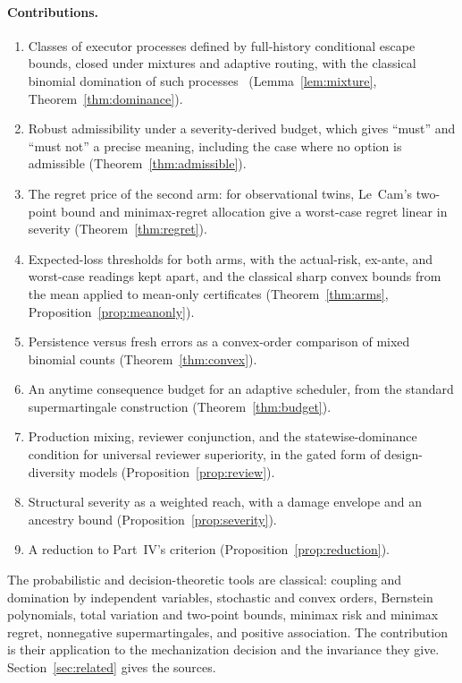 \documentclass[11pt]{article}
\theoremstyle{definition}
\theoremstyle{remark}
\begin{document}
\paragraph{Contributions.}
\begin{enumerate}[leftmargin=*,itemsep=2pt]
\item Classes of executor processes defined by full-history conditional escape bounds, closed
under mixtures and adaptive routing, with the classical binomial domination of such
processes~\cite{doerr} (Lemma~\ref{lem:mixture}, Theorem~\ref{thm:dominance}).
\item Robust admissibility under a severity-derived budget, which gives ``must'' and ``must not''
a precise meaning, including the case where no option is admissible (Theorem~\ref{thm:admissible}).
\item The regret price of the second arm: for observational twins, Le~Cam's two-point bound and
minimax-regret allocation give a worst-case regret linear in severity (Theorem~\ref{thm:regret}).
\item Expected-loss thresholds for both arms, with the actual-risk, ex-ante, and worst-case readings
kept apart, and the classical sharp convex bounds from the mean applied to mean-only certificates
(Theorem~\ref{thm:arms}, Proposition~\ref{prop:meanonly}).
\item Persistence versus fresh errors as a convex-order comparison of mixed binomial counts
(Theorem~\ref{thm:convex}).
\item An anytime consequence budget for an adaptive scheduler, from the standard supermartingale
construction (Theorem~\ref{thm:budget}).
\item Production mixing, reviewer conjunction, and the statewise-dominance condition for universal
reviewer superiority, in the gated form of design-diversity models (Proposition~\ref{prop:review}).
\item Structural severity as a weighted reach, with a damage envelope and an ancestry bound
(Proposition~\ref{prop:severity}).
\item A reduction to Part~IV's criterion (Proposition~\ref{prop:reduction}).
\end{enumerate}
The probabilistic and decision-theoretic tools are classical: coupling and domination by independent
variables, stochastic and convex orders, Bernstein polynomials, total variation and two-point bounds,
minimax risk and minimax regret, nonnegative supermartingales, and positive association. The
contribution is their application to the mechanization decision and the invariance they give.
Section~\ref{sec:related} gives the sources.
\end{document}
